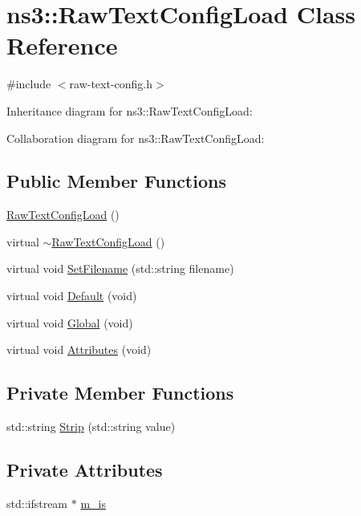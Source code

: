 \hypertarget{classns3_1_1RawTextConfigLoad}{}\section{ns3\+:\+:Raw\+Text\+Config\+Load Class Reference}
\label{classns3_1_1RawTextConfigLoad}


{\ttfamily \#include $<$raw-\/text-\/config.\+h$>$}



Inheritance diagram for ns3\+:\+:Raw\+Text\+Config\+Load\+:


Collaboration diagram for ns3\+:\+:Raw\+Text\+Config\+Load\+:
\subsection*{Public Member Functions}
\begin{DoxyCompactItemize}
\item 
\hyperlink{classns3_1_1RawTextConfigLoad_a49e294292153a1228268e440e05b6f79}{Raw\+Text\+Config\+Load} ()
\item 
virtual \hyperlink{classns3_1_1RawTextConfigLoad_a62ceeb7210e6d0f6cbb738a3c4d571d4}{$\sim$\+Raw\+Text\+Config\+Load} ()
\item 
virtual void \hyperlink{classns3_1_1RawTextConfigLoad_ab7e3722feb39abc7fef4292a3a2aa358}{Set\+Filename} (std\+::string filename)
\item 
virtual void \hyperlink{classns3_1_1RawTextConfigLoad_a1a88f7e4c9b2260b70d881f09cdb0f2f}{Default} (void)
\item 
virtual void \hyperlink{classns3_1_1RawTextConfigLoad_a11d5549a7dd21ee2e9bcede5863c4508}{Global} (void)
\item 
virtual void \hyperlink{classns3_1_1RawTextConfigLoad_ac4f323b065c9fb10bbab85720051b343}{Attributes} (void)
\end{DoxyCompactItemize}
\subsection*{Private Member Functions}
\begin{DoxyCompactItemize}
\item 
std\+::string \hyperlink{classns3_1_1RawTextConfigLoad_aad3ad24f9eeb53999a4366673c12a11e}{Strip} (std\+::string value)
\end{DoxyCompactItemize}
\subsection*{Private Attributes}
\begin{DoxyCompactItemize}
\item 
std\+::ifstream $\ast$ \hyperlink{classns3_1_1RawTextConfigLoad_aab67f5cf3b865b62112dc97e86bc24f6}{m\+\_\+is}
\end{DoxyCompactItemize}


